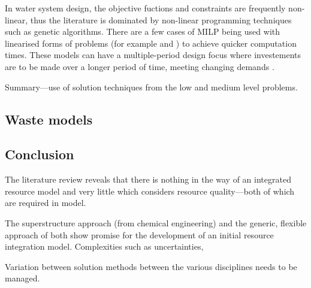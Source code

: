 In water system design, the objective fuctions and constraints are frequently non-linear, thus the literature is dominated by non-linear programming techniques such as genetic algorithms. There are a few cases of MILP being used with linearised forms of problems (for example \citet{Zanganeh2010} and \citet{Lejano2006}) to achieve quicker computation times. These models can have a multiple-period design focus where investements are to be made over a longer period of time, meeting changing demands \citep{Chung2008}.

Summary---use of solution techniques from the low and medium level problems.

\subsection{Waste models}

\subsection{Conclusion}
The literature review reveals that there is nothing in the way of an integrated resource model and very little which considers resource quality---both of which are required in model.

The superstructure approach (from chemical engineering) and the generic, flexible approach of \citet{Samsatli} both show promise for the development of an initial resource integration model. Complexities such as uncertainties, 

Variation between solution methods between the various disciplines needs to be managed.
